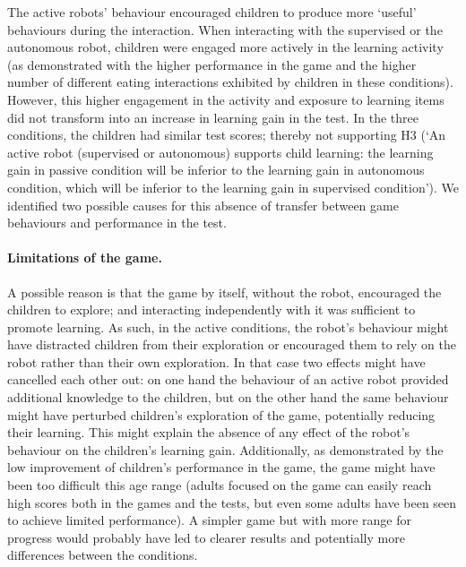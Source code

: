The active robots' behaviour encouraged children to produce more `useful' behaviours during the interaction. When interacting with the supervised or the autonomous robot, children were engaged more actively in the learning activity (as demonstrated with the higher performance in the game and the higher number of different eating interactions exhibited by children in these conditions). However, this higher engagement in the activity and exposure to learning items did not transform into an increase in learning gain in the test. In the three conditions, the children had similar test scores; thereby not supporting H3 (`An active robot (supervised or autonomous) supports child learning: the learning gain in passive condition will be inferior to the learning gain in autonomous condition, which will be inferior to the learning gain in supervised condition'). We identified two possible causes for this absence of transfer between game behaviours and performance in the test. 

\paragraph{Limitations of the game.} A possible reason is that the game by itself, without the robot, encouraged the children to explore; and interacting independently with it was sufficient to promote learning. As such, in the active conditions, the robot's behaviour might have distracted children from their exploration or encouraged them to rely on the robot rather than their own exploration. In that case two effects might have cancelled each other out: on one hand the behaviour of an active robot provided additional knowledge to the children, but on the other hand the same behaviour might have perturbed children's exploration of the game, potentially reducing their learning. This might explain the absence of any effect of the robot's behaviour on the children's learning gain. Additionally, as demonstrated by the low improvement of children's performance in the game, the game might have been too difficult this age range (adults focused on the game can easily reach high scores both in the games and the tests, but even some adults have been seen to achieve limited performance). A simpler game but with more range for progress would probably have led to clearer results and potentially more differences between the conditions.


